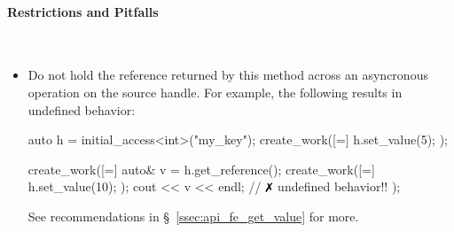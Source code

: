 \paragraph{Restrictions and Pitfalls}\mbox{}\\ 
\begin{itemize}
  \item Do not hold the reference returned by this method across an asyncronous
    operation on the source \gls{handle}.  For example, the following results in
  undefined behavior:
  \begin{CppCode}
	auto h = initial_access<int>("my_key"); 
	create_work([=]{ h.set_value(5); });
	
	create_work([=]{ 
	  auto& v = h.get_reference();
	  create_work([=]{ h.set_value(10); });
	  cout << v << endl; // $\no$ undefined behavior!!
	});
  \end{CppCode}
  See recommendations in \S~\ref{ssec:api_fe_get_value} for more.
\end{itemize}
